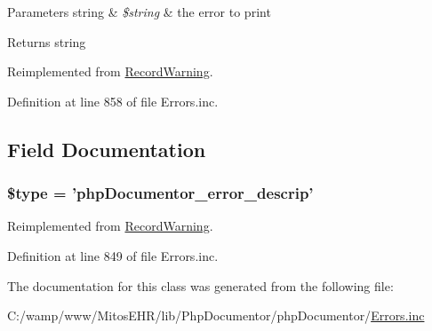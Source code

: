 \begin{DoxyParams}[1]{\-Parameters}
string & {\em \$string} & the error to print\\
\hline
\end{DoxyParams}
\begin{DoxyReturn}{\-Returns}
string 
\end{DoxyReturn}


\-Reimplemented from \hyperlink{class_record_warning_ad513a6759fca8c9a559cc3a06b6db5ff}{\-Record\-Warning}.



\-Definition at line 858 of file \-Errors.\-inc.




\subsection{\-Field \-Documentation}
\hypertarget{class_record_error_a9a4a6fba2208984cabb3afacadf33919}{
\subsubsection[{\$type}]{\setlength{\rightskip}{0pt plus 5cm}\$type = 'php\-Documentor\-\_\-error\-\_\-descrip'}}\label{class_record_error_a9a4a6fba2208984cabb3afacadf33919}


\-Reimplemented from \hyperlink{class_record_warning_a9a4a6fba2208984cabb3afacadf33919}{\-Record\-Warning}.



\-Definition at line 849 of file \-Errors.\-inc.



\-The documentation for this class was generated from the following file\-:\begin{DoxyCompactItemize}
\item 
\-C\-:/wamp/www/\-Mitos\-E\-H\-R/lib/\-Php\-Documentor/php\-Documentor/\hyperlink{_errors_8inc}{\-Errors.\-inc}\end{DoxyCompactItemize}
